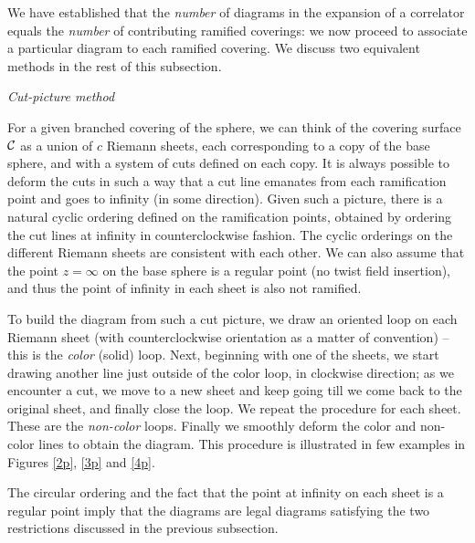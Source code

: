 \documentclass[letterpaper]{JHEP3}
\begin{document}
We have established that the {\it number} of diagrams in the expansion of a correlator
equals the {\it number} of contributing ramified coverings: we now proceed to associate
a particular diagram to  each ramified covering. We discuss two equivalent methods
 in the rest of this subsection.

\medskip
{\it  \noindent Cut-picture method}

\medskip

For a given branched covering of the sphere, we can think of the covering surface ${\cal C}$
as a union of $c$ Riemann sheets, each corresponding to a copy of the base sphere, and with 
 a system of cuts defined on each copy. It is always possible to deform the cuts in such a way
 that  a cut line  emanates from each ramification point and goes to infinity (in some direction).  Given such a picture,
 there is a natural cyclic
 ordering defined on the ramification points, obtained by  ordering the cut lines at infinity in counterclockwise fashion.
  The cyclic orderings on the different Riemann sheets are consistent with each other. 
 We can also assume that the point    $z=\infty$ on the base sphere is  a regular point  (no twist field insertion), and thus the point  of infinity in each sheet is also not ramified.

To build the diagram from such a cut picture, we draw an oriented  loop on each Riemann
sheet  (with counterclockwise orientation as a matter of convention) -- this is the \textit{color} (solid) loop.
Next, beginning with one of the sheets, we start drawing another line just outside of the color loop, in clockwise direction; as we encounter
a cut, we move to a new sheet and keep going till we come back to the original sheet, and finally close the loop.
We repeat the procedure for each sheet. These are the \textit{non-color} loops.
Finally we smoothly deform the color and non-color lines to obtain the diagram. This procedure is illustrated in  few examples in Figures \ref{2p}, \ref{3p} and \ref{4p}.

The circular ordering and the fact that the  point at infinity 
on each sheet is a regular point imply that the diagrams are legal diagrams satisfying the two restrictions discussed in the previous subsection.
\end{document}
